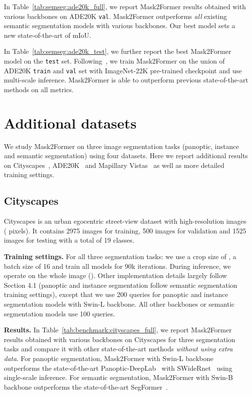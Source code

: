 \documentclass[10pt,twocolumn,letterpaper]{article}
\newcommand{\modelname}{Mask2Former\xspace}
\newcommand{\tabref}[1]{Table~\ref{#1}}
\begin{document}
In \tabref{tab:semseg:ade20k_full}, we report \modelname results obtained with various backbones on ADE20K \texttt{val}. \modelname outperforms \emph{all} existing semantic segmentation models with various backbones. Our best model sets a new state-of-the-art of  mIoU.

In \tabref{tab:semseg:ade20k_test}, we further report the best \modelname model on the \texttt{test} set. Following~\cite{cheng2021maskformer}, we train \modelname on the union of ADE20K \texttt{train} and \texttt{val} set with ImageNet-22K pre-trained checkpoint and use multi-scale inference. \modelname is able to outperform previous state-of-the-art methods on all metrics.

\section{Additional datasets}
\label{app:datasets}

We study \modelname on three image segmentation tasks (panoptic, instance and semantic segmentation) using four datasets. Here we report additional results on Cityscapes~\cite{Cordts2016Cityscapes}, ADE20K~\cite{zhou2017ade20k} and Mapillary Vistas~\cite{neuhold2017mapillary} as well as more detailed training settings.

\subsection{Cityscapes}
Cityscapes is an urban egocentric street-view dataset with high-resolution images ( pixels). It contains 2975 images for training, 500 images for validation and 1525 images for testing with a total of 19 classes.

\noindent\textbf{Training settings.} For all three segmentation tasks: we use a crop size of , a batch size of 16 and train all models for 90k iterations. During inference, we operate on the whole image (). Other implementation details largely follow Section 4.1
(panoptic and instance segmentation follow semantic segmentation training settings), except that we use 200 queries for panoptic and instance segmentation models with Swin-L backbone. All other backbones or semantic segmentation models use 100 queries.

\noindent\textbf{Results.} In \tabref{tab:benchmark:cityscapes_full}, we report \modelname results obtained with various backbones on Cityscapes for three segmentation tasks and compare it with other state-of-the-art methods \emph{without using extra data}. For panoptic segmentation, \modelname with Swin-L backbone outperforms the state-of-the-art Panoptic-DeepLab~\cite{cheng2020panoptic} with SWideRnet~\cite{chen2020scaling} using single-scale inference. For semantic segmentation, \modelname with Swin-B backbone outperforms the state-of-the-art SegFormer~\cite{xie2021segformer}.
\end{document}
